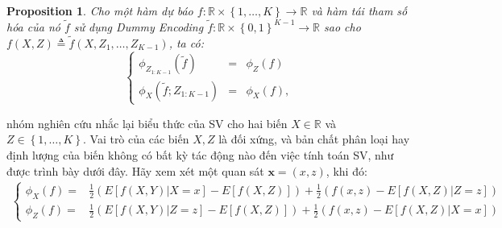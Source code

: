 \documentclass[12pt, a4paper]{article}
\theoremstyle{plain}
\theoremstyle{proposition}
\newtheorem{proposition}{Proposition}[section]
\theoremstyle{lemma}
\newcommand\x{\boldsymbol{x}}
\begin{document}
\begin{proposition}\label{prop:SV_CoalQualitative_sup}
Cho một hàm dự báo $f:\mathbb{R}\times\left\{ 1,\dots,K\right\} \longrightarrow\mathbb{R}$ và hàm tái tham số hóa của nó $\tilde{f}$ sử dụng Dummy Encoding $\tilde{f}:\mathbb{R}\times\left\{ 0,1\right\}^{K-1} \longrightarrow\mathbb{R}$ sao cho $f(X,Z)\triangleq\tilde{f}(X,Z_{1},\dots,Z_{K-1})$, ta có:
 \begin{equation}
\left\{ \begin{array}{lll}
 \phi_{Z_{1:K-1}}(\tilde{f}) & = & \phi_{Z}(f)\\
 \phi_{X}(\tilde{f}; Z_{1:K-1}) & = & \phi_{X}(f),
\end{array}\right.\label{eq:Shapley_CoalitionDummies}
\end{equation}
\end{proposition}
nhóm nghiên cứu nhắc lại biểu thức của SV cho hai biến $X\in\mathbb{R}$ và $Z\in\left\{ 1,\dots,K\right\}$. Vai trò của các biến $X, Z$ là đối xứng, và bản chất phân loại hay định lượng của biến không có bất kỳ tác động nào đến việc tính toán SV, như được trình bày dưới đây. Hãy xem xét một quan sát $\x = (x, z)$, khi đó:
\begin{eqnarray}
\left\{ \begin{array}{ll}
\phi_{X}(f)= & \frac{1}{2}\left(E\left[f(X,Y)\vert X=x\right]-E\left[f\left(X,Z\right)\right]\right)+\frac{1}{2}\left(f\left(x,z\right)-E\left[f\left(X,Z\right)\vert Z=z\right]\right)\\
\phi_{Z}(f)= & \frac{1}{2}\left(E\left[f(X,Y)\vert Z=z\right]-E\left[f\left(X,Z\right)\right]\right)+\frac{1}{2}\left(f\left(x,z\right)-E\left[f\left(X,Z\right)\vert X=x\right]\right)
\end{array}\right.
\label{eq:ShapleyValue_XY_Indiv}
\end{eqnarray}
\end{document}
